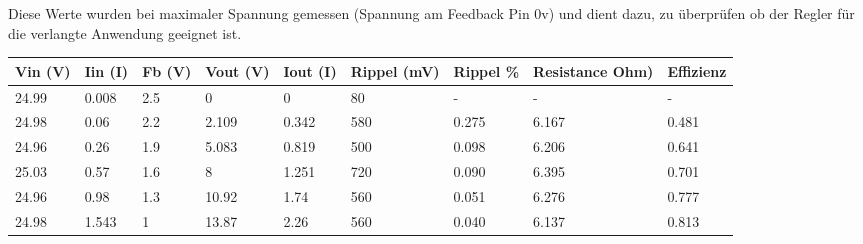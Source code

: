 Diese Werte wurden bei maximaler Spannung gemessen (Spannung am Feedback Pin 0v) und dient dazu, zu überprüfen ob der Regler für die verlangte Anwendung geeignet ist.
\newpage
\begin{table}[h]
\centering

\label{fig::Res6}
\begin{tabular}{|l|l|l|l|l|l|l|l|l|}
\hline
\multicolumn{1}{|c|}{Vin (V)} & \multicolumn{1}{c|}{Iin (I)} & \multicolumn{1}{c|}{Fb (V)} & \multicolumn{1}{c|}{Vout (V)} & \multicolumn{1}{c|}{Iout (I)} & \multicolumn{1}{c|}{Rippel (mV)} & \multicolumn{1}{c|}{Rippel \%} & \multicolumn{1}{c|}{Resistance Ohm)} & \multicolumn{1}{c|}{Effizienz} \\ \hline
24.99                         & 0.008                        & 2.5                         & 0                             & 0                             & 80                               & -                              & -                                    & -                              \\ \hline
24.98                         & 0.06                         & 2.2                         & 2.109                         & 0.342                         & 580                              & 0.275                          & 6.167                                & 0.481                          \\ \hline
24.96                         & 0.26                         & 1.9                         & 5.083                         & 0.819                         & 500                              & 0.098                          & 6.206                                & 0.641                          \\ \hline
25.03                         & 0.57                         & 1.6                         & 8                             & 1.251                         & 720                              & 0.090                          & 6.395                                & 0.701                          \\ \hline
24.96                         & 0.98                         & 1.3                         & 10.92                         & 1.74                          & 560                              & 0.051                          & 6.276                                & 0.777                          \\ \hline
24.98                         & 1.543                        & 1                           & 13.87                         & 2.26                          & 560                              & 0.040                          & 6.137                                & 0.813                          \\ \hline

\end{tabular}
\end{table}
